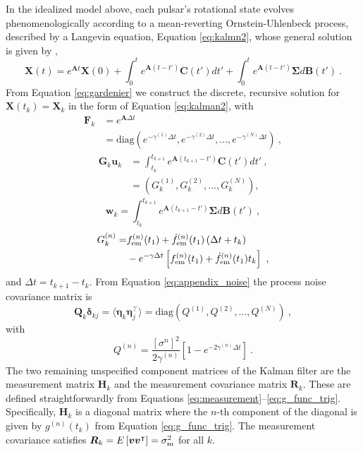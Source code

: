 \documentclass[fleqn,usenatbib,useAMS]{mnras}
\begin{document}
In the idealized model above, each pulsar's rotational state evolves phenomenologically according to a mean-reverting Ornstein-Uhlenbeck process, described by a Langevin equation, Equation \eqref{eq:kalmn2}, whose general solution is given by \citep{gardiner2009stochastic},
\begin{equation}
	\boldsymbol{X}(t) = e^{\boldsymbol{A} t} \boldsymbol{X}(0) + \int_0^t e^{\boldsymbol{A}(t-t')} \boldsymbol{C}(t') dt' + \int_0^t e^{\boldsymbol{A}(t-t')} \boldsymbol{\Sigma} d\boldsymbol{B}(t') \ . \label{eq:gardenier}
\end{equation} 
From Equation \eqref{eq:gardenier} we construct the discrete, recursive solution for $\boldsymbol{X}(t_k) = \boldsymbol{X}_k$ in the form of Equation \eqref{eq:kalman2}, with
\begin{align}
	\boldsymbol{F}_k &= e^{\boldsymbol{A} \Delta t } \  \\
	&= \text{diag}\left(e^{- \gamma^{(1)} \Delta t},e^{- \gamma^{(2)} \Delta t},...,e^{- \gamma^{(N)} \Delta t} \right) \ ,
\end{align}
\begin{align}
	\boldsymbol{G}_k \boldsymbol{u}_k &= \int_{t_k}^{t_{k+1}}  e^{\boldsymbol{A}\left( t_{k+1} - t' \right)}  \boldsymbol{C}(t') dt' \ , \\
	&= \left(G^{(1)}_k, G^{(2)}_k,...,G^{(N)}_k \right) ,
\end{align}
\begin{equation}
	\boldsymbol{w}_k = \int_{t_k}^{t_{k+1}} e^{\boldsymbol{A}\left( t_{k+1} - t' \right)} \boldsymbol{\Sigma} d \boldsymbol{B}(t') \ ,  \label{eq:appendix_noise}
\end{equation}
\begin{align}
	G_k^{(n)} =&    f^{(n)}_{\rm em}(t_1) + \dot{f}^{(n)}_{\rm em}(t_1)  \left(\Delta t + t_k \right) \nonumber \\ 
	&- e^{-\gamma \Delta t} \left[  f^{(n)}_{\rm em}(t_1) +\dot{f}^{(n)}_{\rm em}(t_1)  t_k \right] \ ,
\end{align}
and $\Delta t = t_{k+1} - t_k$. From Equation \eqref{eq:appendix_noise} the process noise covariance matrix is
\begin{equation}
	\boldsymbol{Q}_k \boldsymbol{\delta}_{kj}= \langle \boldsymbol{\eta}_k \boldsymbol{\eta}_j^\intercal \rangle = \text{diag} \left(Q^{(1)}, Q^{(2)},...,Q^{(N)}\right) \ ,
\end{equation}
with 
\begin{equation}
Q^{(n)} = \frac{[\sigma^{n}]^2}{2 \gamma^{(n)}} \left[ 1 - e^{-2 \gamma^{(n)} \Delta t}\right] \ .
\end{equation}
The two remaining unspecified component matrices of the Kalman filter are the measurement matrix $\boldsymbol{H}_k$ and the measurement covariance matrix $\boldsymbol{R}_k$. These are defined straightforwardly from Equations \eqref{eq:measurement}--\eqref{eq:g_func_trig}. Specifically, 
$\boldsymbol{H}_k$ is a diagonal matrix where the $n$-th component of the diagonal is given by $g^{(n)}(t_k)$ from Equation \eqref{eq:g_func_trig}. The measurement covariance satisfies $\boldsymbol{R}_k = E \left[ \boldsymbol{v} \boldsymbol{v}^\intercal \right] = \sigma^2_{\rm m}$ for all $k$.
\end{document}
